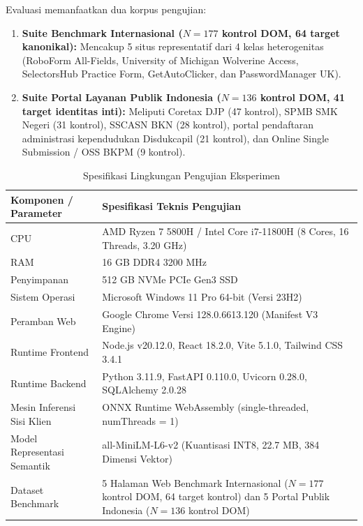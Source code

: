 \documentclass[conference]{IEEEtran}
\begin{document}
Evaluasi memanfaatkan dua korpus pengujian:
\begin{enumerate}[label=(\arabic*), leftmargin=*]
    \item \textbf{Suite Benchmark Internasional ($N = 177$ kontrol DOM, 64 target kanonikal):} Mencakup 5 situs representatif dari 4 kelas heterogenitas (RoboForm All-Fields, University of Michigan Wolverine Access, SelectorsHub Practice Form, GetAutoClicker, dan PasswordManager UK).
    \item \textbf{Suite Portal Layanan Publik Indonesia ($N = 136$ kontrol DOM, 41 target identitas inti):} Meliputi Coretax DJP (47 kontrol), SPMB SMK Negeri (31 kontrol), SSCASN BKN (28 kontrol), portal pendaftaran administrasi kependudukan Disdukcapil (21 kontrol), dan Online Single Submission / OSS BKPM (9 kontrol).
\end{enumerate}

\begin{table}[!htbp]
\caption{Spesifikasi Lingkungan Pengujian Eksperimen}
\label{tab:experimental_env}
\centering
\scriptsize
\setlength{\tabcolsep}{3.5pt}
\begin{tabularx}{\columnwidth}{p{2.8cm} X}
\toprule
\textbf{Komponen / Parameter} & \textbf{Spesifikasi Teknis Pengujian} \\
\midrule
CPU & AMD Ryzen 7 5800H / Intel Core i7-11800H (8 Cores, 16 Threads, 3.20 GHz) \\
RAM & 16 GB DDR4 3200 MHz \\
Penyimpanan & 512 GB NVMe PCIe Gen3 SSD \\
Sistem Operasi & Microsoft Windows 11 Pro 64-bit (Versi 23H2) \\
Peramban Web & Google Chrome Versi 128.0.6613.120 (Manifest V3 Engine) \\
Runtime Frontend & Node.js v20.12.0, React 18.2.0, Vite 5.1.0, Tailwind CSS 3.4.1 \\
Runtime Backend & Python 3.11.9, FastAPI 0.110.0, Uvicorn 0.28.0, SQLAlchemy 2.0.28 \\
Mesin Inferensi Sisi Klien & ONNX Runtime WebAssembly (single-threaded, numThreads = 1) \\
Model Representasi Semantik & all-MiniLM-L6-v2 (Kuantisasi INT8, 22.7 MB, 384 Dimensi Vektor) \\
Dataset Benchmark & 5 Halaman Web Benchmark Internasional ($N = 177$ kontrol DOM, 64 target kontrol) dan 5 Portal Publik Indonesia ($N = 136$ kontrol DOM) \\
\bottomrule
\end{tabularx}
\end{table}
\end{document}
